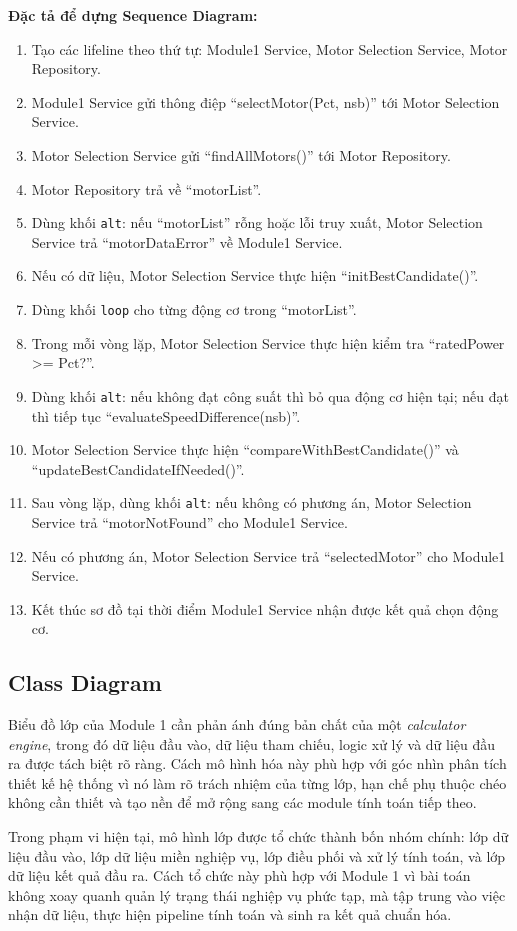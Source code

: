 \documentclass[a4paper]{article}
\begin{document}
\textbf{Đặc tả để dựng Sequence Diagram:}
\begin{enumerate}
\item Tạo các lifeline theo thứ tự: Module1 Service, Motor Selection Service, Motor Repository.
\item Module1 Service gửi thông điệp ``selectMotor(Pct, nsb)'' tới Motor Selection Service.
\item Motor Selection Service gửi ``findAllMotors()'' tới Motor Repository.
\item Motor Repository trả về ``motorList''.
\item Dùng khối \texttt{alt}: nếu ``motorList'' rỗng hoặc lỗi truy xuất, Motor Selection Service trả ``motorDataError'' về Module1 Service.
\item Nếu có dữ liệu, Motor Selection Service thực hiện ``initBestCandidate()''.
\item Dùng khối \texttt{loop} cho từng động cơ trong ``motorList''.
\item Trong mỗi vòng lặp, Motor Selection Service thực hiện kiểm tra ``ratedPower >= Pct?''.
\item Dùng khối \texttt{alt}: nếu không đạt công suất thì bỏ qua động cơ hiện tại; nếu đạt thì tiếp tục ``evaluateSpeedDifference(nsb)''.
\item Motor Selection Service thực hiện ``compareWithBestCandidate()'' và ``updateBestCandidateIfNeeded()''.
\item Sau vòng lặp, dùng khối \texttt{alt}: nếu không có phương án, Motor Selection Service trả ``motorNotFound'' cho Module1 Service.
\item Nếu có phương án, Motor Selection Service trả ``selectedMotor'' cho Module1 Service.
\item Kết thúc sơ đồ tại thời điểm Module1 Service nhận được kết quả chọn động cơ.
\end{enumerate}


\subsection{Class Diagram }
Biểu đồ lớp của Module 1 cần phản ánh đúng bản chất của một \textit{calculator engine}, trong đó dữ liệu đầu vào, dữ liệu tham chiếu, logic xử lý và dữ liệu đầu ra được tách biệt rõ ràng. Cách mô hình hóa này phù hợp với góc nhìn phân tích thiết kế hệ thống vì nó làm rõ trách nhiệm của từng lớp, hạn chế phụ thuộc chéo không cần thiết và tạo nền để mở rộng sang các module tính toán tiếp theo.

Trong phạm vi hiện tại, mô hình lớp được tổ chức thành bốn nhóm chính: lớp dữ liệu đầu vào, lớp dữ liệu miền nghiệp vụ, lớp điều phối và xử lý tính toán, và lớp dữ liệu kết quả đầu ra. Cách tổ chức này phù hợp với Module 1 vì bài toán không xoay quanh quản lý trạng thái nghiệp vụ phức tạp, mà tập trung vào việc nhận dữ liệu, thực hiện pipeline tính toán và sinh ra kết quả chuẩn hóa.
\end{document}
